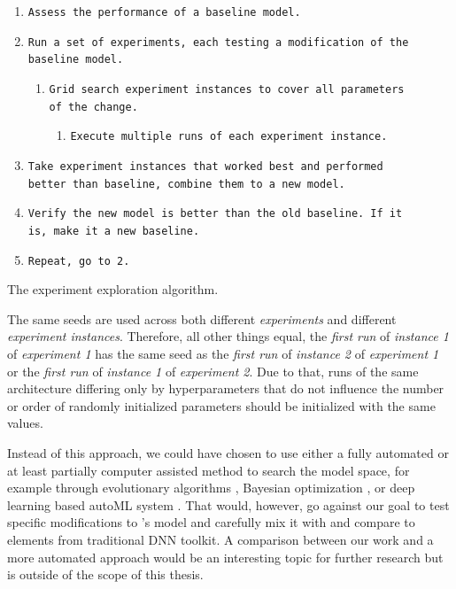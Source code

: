 \begin{enumerate}[noitemsep]
    \item \texttt{Assess the performance of a baseline model.}
    \item \texttt{Run a set of experiments, each testing a modification of the\\ baseline model.}
    \begin{enumerate}[nosep]
        \item \texttt{Grid search experiment instances to cover all parameters\\ of the change.}
        \begin{enumerate}[nosep]
            \item \texttt{Execute multiple runs of each experiment instance.}
        \end{enumerate}
    \end{enumerate}
    \item \texttt{Take experiment instances that worked best and performed\\ better than baseline, combine them to a new model.}
    \item \texttt{Verify the new model is better than the old baseline. If it\\ is, make it a new baseline.}
    \item \texttt{Repeat, go to 2.}
\end{enumerate}
\begin{center}
    {The experiment exploration algorithm.}
\end{center}

The same seeds are used across both different \textit{experiments} and different \textit{experiment instances}. Therefore, all other things equal, the \textit{first run} of \textit{instance 1} of \textit{experiment  1} has the same seed as the \textit{first run} of \textit{instance 2} of \textit{experiment 1} or the \textit{first run} of \textit{instance 1} of \textit{experiment 2}. Due to that, runs of the same architecture differing only by hyperparameters that do not influence the number or order of randomly initialized parameters should be initialized with the same values.

Instead of this approach, we could have chosen to use either a fully automated or at least partially computer assisted method to search the model space, for example through evolutionary algorithms \citep{2017arXiv170300548M}, Bayesian optimization \citep{thesis_arnold}, or deep learning based autoML system \citep{2016arXiv161101578Z}. That would, however, go against our goal to test specific modifications to \citeauthor{antolik}’s model and carefully mix it with and compare to elements from traditional DNN toolkit. A comparison between our work and a more automated approach would be an interesting topic for further research but is outside of the scope of this thesis.

